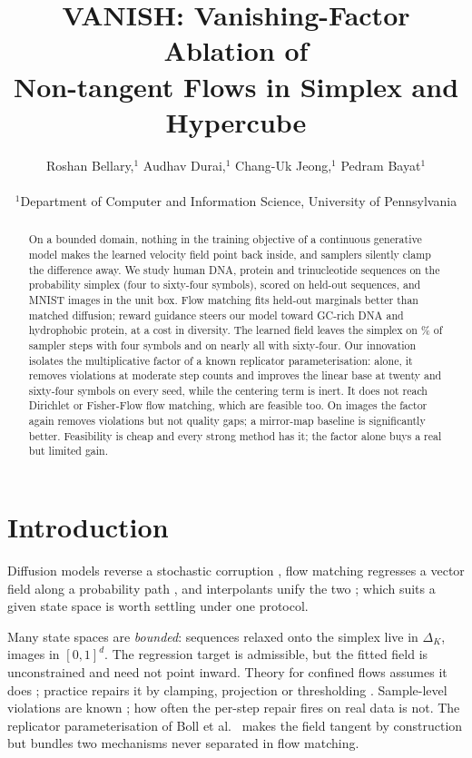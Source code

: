 \documentclass{article}
\title{VANISH: Vanishing-Factor Ablation of\\ Non-tangent Flows in Simplex and Hypercube}
\author{
  Roshan Bellary,$^{1}$ Audhav Durai,$^{1}$ Chang-Uk Jeong,$^{1}$ Pedram Bayat$^{1}$\\
  \\
  $^{1}$Department of Computer and Information Science, University of Pennsylvania
}
\begin{document}
\maketitle

\begin{abstract}
On a bounded domain, nothing in the training objective of a continuous generative model makes the
learned velocity field point back inside, and samplers silently clamp the difference away. We study
human DNA, protein and trinucleotide sequences on the probability simplex (four to sixty-four
symbols), scored on held-out sequences, and MNIST images in the unit box. Flow matching fits held-out
marginals better than matched diffusion; reward guidance steers our model toward GC-rich DNA and
hydrophobic protein, at a cost in diversity. The learned field leaves the simplex on \BaseViolPctDna\% of sampler steps with four
symbols and on nearly all with sixty-four. Our innovation isolates the multiplicative factor of a known replicator
parameterisation: alone, it removes violations at moderate step counts and improves the linear base
at twenty and sixty-four symbols on every seed, while the centering term is inert. It does not reach
Dirichlet or Fisher-Flow flow matching, which are feasible too. On images the factor again removes
violations but not quality gaps; a mirror-map baseline is significantly better. Feasibility is cheap
and every strong method has it; the factor alone buys a real but limited gain.
\end{abstract}

\section{Introduction}

Diffusion models reverse a stochastic corruption \citep{karras2022edm}, flow matching regresses a
vector field along a probability path \citep{lipman2022flow}, and interpolants unify the two
\citep{albergo2023interpolants}; which suits a given state space is worth settling under one protocol.

Many state spaces are \emph{bounded}: sequences relaxed onto the simplex
\citep{stark2024dirichlet,davis2024fisher,tang2025gumbel} live in $\Delta_K$, images in $[0,1]^d$.
The regression target is admissible, but the fitted field is unconstrained and need not point
inward. Theory for confined flows assumes it does
\citep{cont2026noflux}; practice repairs it by clamping, projection or thresholding
\citep{stark2024dirichlet,saharia2022imagen}. Sample-level violations are known
\citep{xie2024reflected}; how often the per-step repair fires on real data is not. The replicator parameterisation of Boll et al.~\citep{boll2024assignment}
makes the field tangent by construction but bundles two mechanisms never separated in flow matching.
\end{document}
